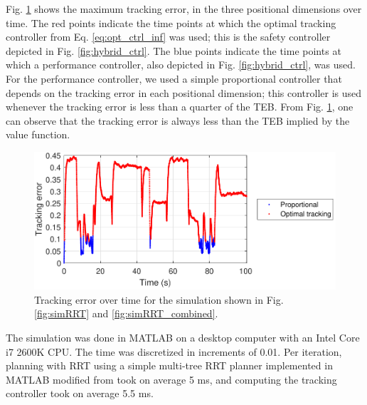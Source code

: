 Fig. \ref{fig:tracking_error_RRT} shows the maximum tracking error, in the three positional dimensions over time.
The red points indicate the time points at which the optimal tracking controller from Eq. \eqref{eq:opt_ctrl_inf} was used; this is the safety controller depicted in Fig. \ref{fig:hybrid_ctrl}. 
The blue points indicate the time points at which a performance controller, also depicted in Fig. \ref{fig:hybrid_ctrl}, was used.
For the performance controller, we used a simple proportional controller that depends on the tracking error in each positional dimension; this controller is used whenever the tracking error is less than a quarter of the TEB.
From Fig. \ref{fig:tracking_error_RRT}, one can observe that the tracking error is always less than the TEB implied by the value function.


\begin{figure}
  \includegraphics[width=\columnwidth]{fig/Q10D_Q3D/tracking_error}
  \caption{Tracking error over time for the simulation shown in Fig. \ref{fig:simRRT} and \ref{fig:simRRT_combined}.}
  \label{fig:tracking_error_RRT}  
\end{figure}

The simulation was done in MATLAB on a desktop computer with an Intel Core i7 2600K CPU.
The time was discretized in increments of 0.01.
Per iteration, planning with RRT using a simple multi-tree RRT planner implemented in MATLAB modified from \cite{Gavin2013} took on average 5 ms, and computing the tracking controller took on average 5.5 ms. 

